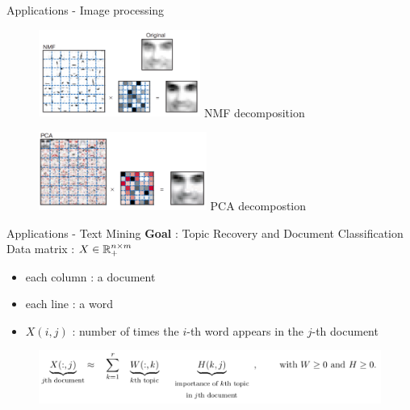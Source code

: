 \begin{frame}{Applications - Image processing}
    \begin{figure}[h!]
        \centering
        \begin{minipage}{0.45\textwidth}
            \centering
            \includegraphics[width=5.3cm]{../images/NMFcomp.png}
            NMF decomposition
        \end{minipage}
        \hfill
        \begin{minipage}{0.45\textwidth}
            \centering
            \includegraphics[width=5.5cm]{../images/PCAcomp.png}
            PCA decompostion
        \end{minipage}
    \end{figure}
\end{frame}
\begin{frame}{Applications - Text Mining}
    \textbf{Goal} : Topic Recovery and Document Classification\\
    \vspace{0.7cm}
    Data matrix : $X\in\mathbb{R}^{n\times m}_+$\\
    \begin{itemize}
        \item each column : a document
        \item each line : a word
        \item $X(i,j)$ : number of times the $i$-th word appears in the $j$-th document
    \end{itemize}
    \begin{figure}
        \centering
        \includegraphics[width=0.9\linewidth]{../images/NMF_app2.png}
    \end{figure}
\end{frame}
